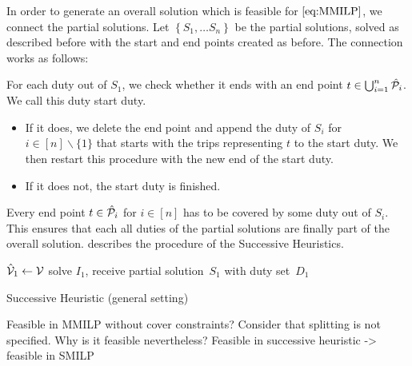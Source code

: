 In order to generate an overall solution which is feasible for $\eqref{eq:MMILP}$, we connect the partial solutions. Let ${\left\{S_1,\dots S_n\right\}}$ be the partial solutions, solved as described before with the start and end points created as before. The connection works as follows:

For each duty out of $S_1$, we check whether it ends with an end point $t\in\bigcup_{i=1}^n\hat{\mathcal{P}}_i$. We call this duty start duty.
\begin{itemize}
	\item
		If it does, we delete the end point and append the duty of $S_i$ for ${i\in[n]\backslash\{1\}}$ that starts with the trips representing $t$ to the start duty. We then restart this procedure with the new end of the start duty.
	\item
		If it does not, the start duty is finished.
\end{itemize}

Every end point $t\in\hat{\mathcal{P}}_i$ for $i\in[n]$ has to be covered by some duty out of $S_i$. This ensures that each all duties of the partial solutions are finally part of the overall solution.  describes the procedure of the Successive Heuristics.

\begin{algorithm}[htb]
	\SetAlgoLined
	$\hat{\mathcal{V}}_1\gets\mathcal{V}$\;
	solve $I_1$, receive partial solution~$S_1$ with duty set~$D_1$\;
	\caption{Successive Heuristic (general setting) \label{alg:successive_heuristic}}
\end{algorithm}

\begin{theorem}

Feasible in MMILP without cover constraints? 
Consider that splitting is not specified. Why is it feasible nevertheless?
Feasible in successive heuristic -> feasible in SMILP

\end{theorem}

